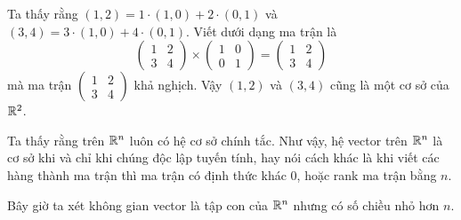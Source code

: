 Ta thấy rằng $(1, 2) = 1 \cdot (1, 0) + 2 \cdot (0, 1)$
và $(3, 4) = 3 \cdot (1, 0) + 4 \cdot (0, 1)$. Viết dưới 
dạng ma trận là
\[
    \begin{pmatrix} 1 & 2 \\ 3 & 4 \end{pmatrix}
    \times \begin{pmatrix} 1 & 0 \\ 0 & 1 \end{pmatrix}
    = \begin{pmatrix} 1 & 2 \\ 3 & 4 \end{pmatrix}
\]
mà ma trận $\begin{pmatrix} 1 & 2 \\ 3 & 4 \end{pmatrix}$
khả nghịch. Vậy $(1, 2)$ và $(3, 4)$ cũng là một cơ sở của $\mathbb{R}^2$.

\begin{remark}
    Ta thấy rằng trên $\mathbb{R}^n$ luôn có hệ cơ sở chính tắc.
    Như vậy, hệ vector trên $\mathbb{R}^n$ là cơ sở khi và chỉ khi 
    chúng độc lập tuyến tính, hay nói cách khác là khi viết 
    các hàng thành ma trận thì ma trận có định thức khác 0,
    hoặc rank ma trận bằng $n$.
\end{remark}

Bây giờ ta xét không gian vector là tập con của $\mathbb{R}^n$ nhưng
có số chiều nhỏ hơn $n$.

